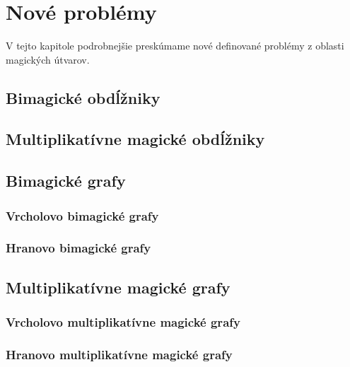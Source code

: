 \chapter{Nové problémy}

\label{kap:newproblems} %

V tejto kapitole podrobnejšie preskúmame nové definované problémy z oblasti magických útvarov.

\section{Bimagické obdĺžniky}
	
\section{Multiplikatívne magické obdĺžniky}

\section{Bimagické grafy}

\subsection{Vrcholovo bimagické grafy}

\subsection{Hranovo bimagické grafy}

\section{Multiplikatívne magické grafy}

\subsection{Vrcholovo multiplikatívne magické grafy}

\subsection{Hranovo multiplikatívne magické grafy}

